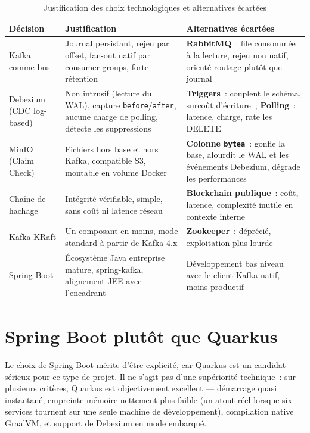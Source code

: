\documentclass[12pt,a4paper,openany]{report}
\begin{document}
    \begin{table}[H]
    \centering
    \small
    \begin{tabularx}{\textwidth}{p{2.6cm}Xp{4.4cm}}
    \toprule
    \textbf{D\'ecision} & \textbf{Justification} & \textbf{Alternatives \'ecart\'ees} \\
    \midrule
    Kafka comme bus & Journal persistant, rejeu par offset, fan-out natif par consumer groups, forte r\'etention & \textbf{RabbitMQ}~: file consomm\'ee \`a la lecture, rejeu non natif, orient\'e routage plut\^ot que journal \\[4pt]
    Debezium (CDC log-based) & Non intrusif (lecture du WAL), capture \texttt{before}/\texttt{after}, aucune charge de polling, d\'etecte les suppressions & \textbf{Triggers}~: couplent le sch\'ema, surco\^ut d'\'ecriture~; \textbf{Polling}~: latence, charge, rate les DELETE \\[4pt]
    MinIO (Claim Check) & Fichiers hors base et hors Kafka, compatible S3, montable en volume Docker & \textbf{Colonne \texttt{bytea}}~: gonfle la base, alourdit le WAL et les \'ev\'enements Debezium, d\'egrade les performances \\[4pt]
    Cha\^ine de hachage & Int\'egrit\'e v\'erifiable, simple, sans co\^ut ni latence r\'eseau & \textbf{Blockchain publique}~: co\^ut, latence, complexit\'e inutile en contexte interne \\[4pt]
    Kafka KRaft & Un composant en moins, mode standard \`a partir de Kafka 4.x & \textbf{Zookeeper}~: d\'epr\'eci\'e, exploitation plus lourde \\[4pt]
    Spring Boot & \'Ecosyst\`eme Java entreprise mature, spring-kafka, alignement JEE avec l'encadrant & D\'eveloppement bas niveau avec le client Kafka natif, moins productif \\
    \bottomrule
    \end{tabularx}
    \caption{Justification des choix technologiques et alternatives \'ecart\'ees}
    \end{table}

    \section{Spring Boot plut\^ot que Quarkus}

    Le choix de Spring Boot m\'erite d'\^etre explicit\'e, car Quarkus est un candidat s\'erieux pour ce type de projet. Il ne s'agit pas d'une sup\'eriorit\'e technique~: sur plusieurs crit\`eres, Quarkus est objectivement excellent --- d\'emarrage quasi instantan\'e, empreinte m\'emoire nettement plus faible (un atout r\'eel lorsque six services tournent sur une seule machine de d\'eveloppement), compilation native GraalVM, et support de Debezium en mode embarqu\'e.
\end{document}
